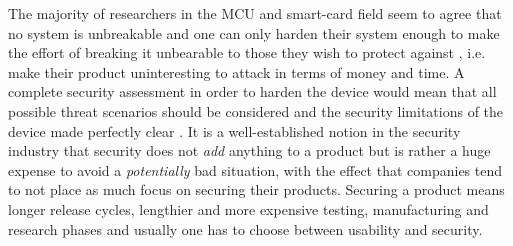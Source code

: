 The majority of researchers in the MCU and smart-card field seem to agree that no system is unbreakable and one can only harden their system enough to make the effort of breaking it unbearable to those they wish to protect against \citep{anderson:cautionary_note} \cite{sergei:thesis}, i.e. make their product uninteresting to attack in terms of money and time. A complete security assessment in order to harden the device would mean that all possible threat scenarios should be considered and the security limitations of the device made perfectly clear \citep{kocher:DPA}. It is a well-established notion in the security industry that security does not \emph{add} anything to a product but is rather a huge expense to avoid a \emph{potentially} bad situation, with the effect that companies tend to not place as much focus on securing their products. Securing a product means longer release cycles, lengthier and more expensive testing, manufacturing and research phases \citep{kocher:DPA} and usually one has to choose between usability and security.